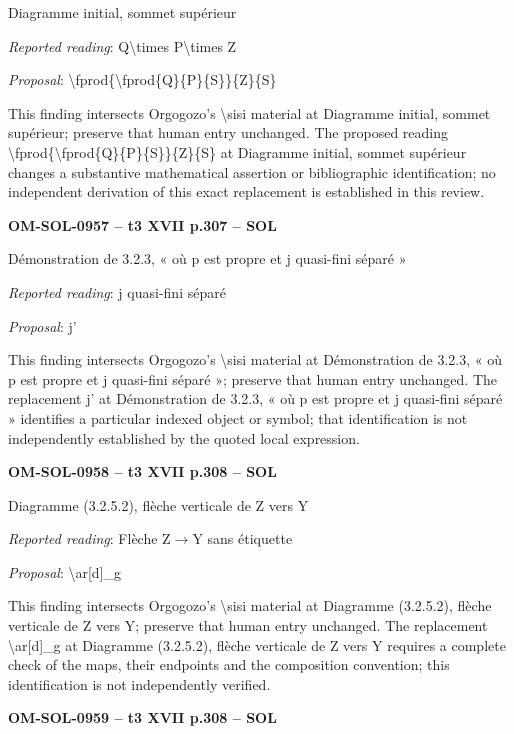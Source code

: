 Diagramme initial, sommet supérieur\par
\emph{Reported reading}: Q\textbackslash{}times P\textbackslash{}times Z\par
\emph{Proposal}: \textbackslash{}fprod\{\textbackslash{}fprod\{Q\}\{P\}\{S\}\}\{Z\}\{S\}\par
This finding intersects Orgogozo's \textbackslash{}sisi material at Diagramme initial, sommet supérieur; preserve that human entry unchanged. The proposed reading \textbackslash{}fprod\{\textbackslash{}fprod\{Q\}\{P\}\{S\}\}\{Z\}\{S\} at Diagramme initial, sommet supérieur changes a substantive mathematical assertion or bibliographic identification; no independent derivation of this exact replacement is established in this review.\par
\par\noindent\textbf{OM-SOL-0957 -- t3 XVII p.307 -- SOL}\par
Démonstration de 3.2.3, « où p est propre et j quasi-fini séparé »\par
\emph{Reported reading}: j quasi-fini séparé\par
\emph{Proposal}: j'\par
This finding intersects Orgogozo's \textbackslash{}sisi material at Démonstration de 3.2.3, « où p est propre et j quasi-fini séparé »; preserve that human entry unchanged. The replacement j' at Démonstration de 3.2.3, « où p est propre et j quasi-fini séparé » identifies a particular indexed object or symbol; that identification is not independently established by the quoted local expression.\par
\par\noindent\textbf{OM-SOL-0958 -- t3 XVII p.308 -- SOL}\par
Diagramme (3.2.5.2), flèche verticale de Z vers Y\par
\emph{Reported reading}: Flèche Z\ensuremath{\to}Y sans étiquette\par
\emph{Proposal}: \textbackslash{}ar[d]\_g\par
This finding intersects Orgogozo's \textbackslash{}sisi material at Diagramme (3.2.5.2), flèche verticale de Z vers Y; preserve that human entry unchanged. The replacement \textbackslash{}ar[d]\_g at Diagramme (3.2.5.2), flèche verticale de Z vers Y requires a complete check of the maps, their endpoints and the composition convention; this identification is not independently verified.\par
\par\noindent\textbf{OM-SOL-0959 -- t3 XVII p.308 -- SOL}\par
